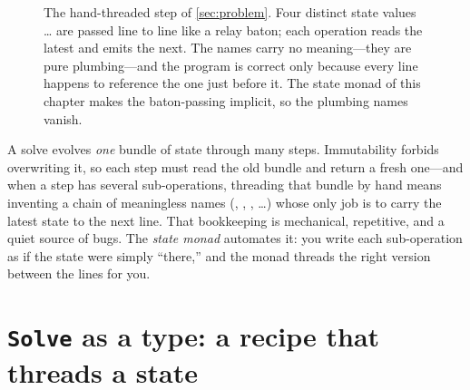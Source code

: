\begin{figure}[t]
\centering
{}
\caption[Threading state by hand]{The hand-threaded step of \cref{sec:problem}.
Four distinct state values \dots{} are passed line to line like a
relay baton; each operation reads the latest and emits the next. The names carry no
meaning---they are pure plumbing---and the program is correct only because every
line happens to reference the one just before it. The state monad of this chapter
makes the baton-passing implicit, so the plumbing names vanish.}
\label{fig:byhand}
\end{figure}

\begin{keyidea}
A solve evolves \emph{one} bundle of state through many steps. Immutability forbids
overwriting it, so each step must read the old bundle and return a fresh one---and
when a step has several sub-operations, threading that bundle by hand means inventing
a chain of meaningless names (, , , \dots) whose only job
is to carry the latest state to the next line. That bookkeeping is mechanical,
repetitive, and a quiet source of bugs. The \emph{state monad} automates it: you
write each sub-operation as if the state were simply ``there,'' and the monad threads
the right version between the lines for you.
\end{keyidea}

\section{\texttt{Solve} as a type: a recipe that threads a state}
\label{sec:solvetype}

